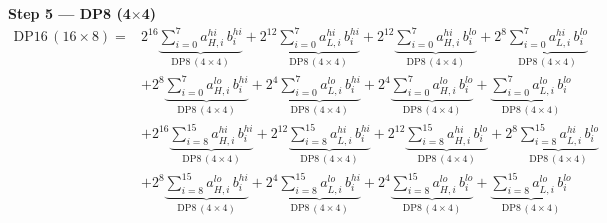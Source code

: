 \documentclass[fleqn]{article}
\newcommand{\DPop}[3]{\mathrm{DP#1}\,(#2\!\times\!#3)}
\begin{document}
\textbf{Step 5 --- DP8 (4$\times$4)}
\begin{align*}
\DPop{16}{16}{8} = {}
  & 2^{16}\underbrace{\sum_{i=0}^{7} a_{H,i}^{hi}\, b_i^{hi}}_{\DPop{8}{4}{4}}
  + 2^{12}\underbrace{\sum_{i=0}^{7} a_{L,i}^{hi}\, b_i^{hi}}_{\DPop{8}{4}{4}}
  + 2^{12}\underbrace{\sum_{i=0}^{7} a_{H,i}^{hi}\, b_i^{lo}}_{\DPop{8}{4}{4}}
  + 2^{8}\underbrace{\sum_{i=0}^{7} a_{L,i}^{hi}\, b_i^{lo}}_{\DPop{8}{4}{4}} \\[0.6em]
  & + 2^{8}\underbrace{\sum_{i=0}^{7} a_{H,i}^{lo}\, b_i^{hi}}_{\DPop{8}{4}{4}}
  + 2^{4}\underbrace{\sum_{i=0}^{7} a_{L,i}^{lo}\, b_i^{hi}}_{\DPop{8}{4}{4}}
  + 2^{4}\underbrace{\sum_{i=0}^{7} a_{H,i}^{lo}\, b_i^{lo}}_{\DPop{8}{4}{4}}
  + \underbrace{\sum_{i=0}^{7} a_{L,i}^{lo}\, b_i^{lo}}_{\DPop{8}{4}{4}} \\[0.6em]
  & + 2^{16}\underbrace{\sum_{i=8}^{15} a_{H,i}^{hi}\, b_i^{hi}}_{\DPop{8}{4}{4}}
  + 2^{12}\underbrace{\sum_{i=8}^{15} a_{L,i}^{hi}\, b_i^{hi}}_{\DPop{8}{4}{4}}
  + 2^{12}\underbrace{\sum_{i=8}^{15} a_{H,i}^{hi}\, b_i^{lo}}_{\DPop{8}{4}{4}}
  + 2^{8}\underbrace{\sum_{i=8}^{15} a_{L,i}^{hi}\, b_i^{lo}}_{\DPop{8}{4}{4}} \\[0.6em]
  & + 2^{8}\underbrace{\sum_{i=8}^{15} a_{H,i}^{lo}\, b_i^{hi}}_{\DPop{8}{4}{4}}
  + 2^{4}\underbrace{\sum_{i=8}^{15} a_{L,i}^{lo}\, b_i^{hi}}_{\DPop{8}{4}{4}}
  + 2^{4}\underbrace{\sum_{i=8}^{15} a_{H,i}^{lo}\, b_i^{lo}}_{\DPop{8}{4}{4}}
  + \underbrace{\sum_{i=8}^{15} a_{L,i}^{lo}\, b_i^{lo}}_{\DPop{8}{4}{4}}
\end{align*}
\end{document}
